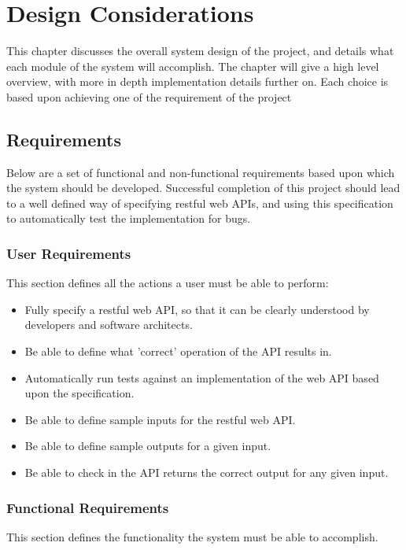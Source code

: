\chapter{Design Considerations}

This chapter discusses the overall system design of the project, and details what each module of the system will accomplish. The chapter will give a high level overview, with more in depth implementation details further on. Each choice is based upon achieving one of the requirement of the project

\section{Requirements}

Below are a set of functional and non-functional requirements based upon which the system should be developed. Successful completion of this project should lead to a well defined way of specifying restful web APIs, and using this specification to automatically test the implementation for bugs.

\subsection{User Requirements}

This section defines all the actions a user must be able to perform:

\begin{itemize}
\item Fully specify a restful web API, so that it can be clearly understood by developers and software architects.
\item Be able to define what 'correct' operation of the API results in.
\item Automatically run tests against an implementation of the web API based upon the specification.
\item Be able to define sample inputs for the restful web API.
\item Be able to define sample outputs for a given input.
\item Be able to check in the API returns the correct output for any given input.
\end{itemize}

\subsection{Functional Requirements}

This section defines the functionality the system must be able to accomplish.

